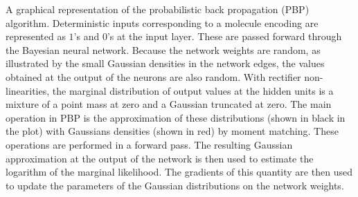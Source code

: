 A graphical representation of the probabilistic back propagation (PBP)
algorithm. Deterministic inputs corresponding to a molecule encoding are represented as $1$'s and $0$'s at the input
layer. These are passed forward through the Bayesian neural network. Because the network weights are random, as illustrated
by the small Gaussian densities in the network edges, the values obtained at the output of the
neurons are also random. With rectifier non-linearities, the marginal distribution of output values at the hidden units is a mixture
of a point mass at zero and a Gaussian truncated at zero. 
The main operation in PBP is the approximation of
these distributions (shown in black in the plot) with Gaussians densities (shown in red) by moment matching. These
operations are performed in a forward pass. The resulting Gaussian
approximation at the output of the network is then used to estimate the
logarithm of the marginal likelihood. The gradients of this quantity are then
used to update the parameters of the Gaussian distributions on the network
weights.
\label{fig:pbp}